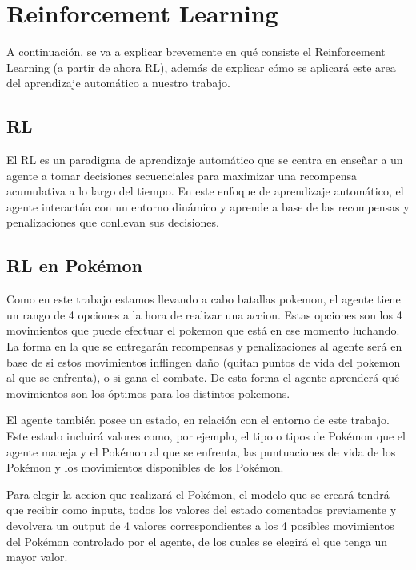 \chapter{Reinforcement Learning}

A continuación, se va a explicar brevemente en qué consiste el Reinforcement Learning (a partir de ahora RL), además de explicar cómo se aplicará este area del aprendizaje automático a nuestro trabajo.

\section{RL}

El RL es un paradigma de aprendizaje automático que se centra en enseñar a un agente a tomar decisiones secuenciales para maximizar una recompensa acumulativa a lo largo del tiempo. En este enfoque de aprendizaje automático, el agente interactúa con un entorno dinámico y aprende a base de las recompensas y penalizaciones que conllevan sus decisiones.

\section{RL en Pokémon}

Como en este trabajo estamos llevando a cabo batallas pokemon, el agente tiene un rango de 4 opciones a la hora de realizar una accion. Estas opciones son los 4 movimientos que puede efectuar el pokemon que está en ese momento luchando. La forma en la que se entregarán recompensas y penalizaciones al agente será en base de si estos movimientos inflingen daño (quitan puntos de vida del pokemon al que se enfrenta), o si gana el combate. De esta forma el agente aprenderá qué movimientos son los óptimos para los distintos pokemons.

El agente también posee un estado, en relación con el entorno de este trabajo. Este estado incluirá valores como, por ejemplo, el tipo o tipos de Pokémon que el agente maneja y el Pokémon al que se enfrenta, las puntuaciones de vida de los Pokémon y los movimientos disponibles de los Pokémon.

Para elegir la accion que realizará el Pokémon, el modelo que se creará tendrá que recibir como inputs, todos los valores del estado comentados previamente y devolvera un output de 4 valores correspondientes a los 4 posibles movimientos del Pokémon controlado por el agente, de los cuales se elegirá el que tenga un mayor valor.